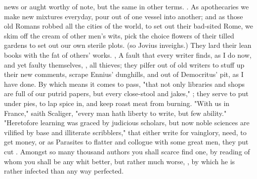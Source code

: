 news or aught worthy of note, but the same in other terms. .
As apothecaries we make new mixtures everyday, pour out of one vessel into
another; and as those old Romans robbed all the cities of the world, to set out
their bad-sited Rome, we skim off the cream of other men's wits, pick the
choice flowers of their tilled gardens to set out our own sterile plots.
 (so
Jovius inveighs.) They lard their lean books with the fat of
others' works. , \etc{} A fault that every writer finds, as
I do now, and yet faulty themselves, , all thieves; they pilfer out of old writers to stuff up their new
comments, scrape Ennius' dunghills, and out of Democritus'
pit, as I have done. By which means it comes to pass, "that
not only libraries and shops are full of our putrid papers, but every
close-stool and jakes," ; they serve
to put under pies, to lap spice in, and keep roast meat from
burning. "With us in France," saith Scaliger, "every man
hath liberty to write, but few ability." "Heretofore
learning was graced by judicious scholars, but now noble sciences are vilified
by base and illiterate scribblers," that either write for vainglory, need, to
get money, or as Parasites to flatter and collogue with some great men, they
put cut .
Amongst so many thousand authors you shall scarce find one,
by reading of whom you shall be any whit better, but rather much worse,
, by which he is rather infected
than any way perfected.


